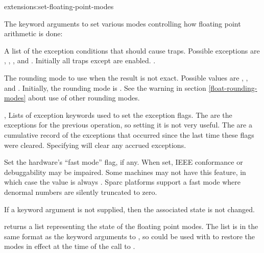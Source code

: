 \begin{defun}{extensions:}{set-floating-point-modes}{%
    }
  
  The keyword arguments to  set various
  modes controlling how floating point arithmetic is done:
  \begin{Lentry}
  
  \item[\kwd{traps}] A list of the exception conditions that should
    cause traps.  Possible exceptions are ,
    , ,  and
    .  Initially all traps except 
    are enabled.  .
    
  \item[\kwd{rounding-mode}] The rounding mode to use when the result
    is not exact. Possible values are ,
    ,  and .
    Initially, the rounding mode is . See the warning in
    section \ref{float-rounding-modes} about use of other rounding
    modes.
  
  \item[\kwd{current-exceptions}, \kwd{accrued-exceptions}] Lists of
    exception keywords used to set the exception flags.  The
     are the exceptions for the previous
    operation, so setting it is not very useful.  The
     are a cumulative record of the exceptions
    that occurred since the last time these flags were cleared.
    Specifying \code{()} will clear any accrued exceptions.
  
  \item[\kwd{fast-mode}] Set the hardware's ``fast mode'' flag, if
    any.  When set, IEEE conformance or debuggability may be impaired.
    Some machines may not have this feature, in which case the value
    is always \false.  Sparc platforms support a fast mode where
    denormal numbers are silently truncated to zero.
  \end{Lentry}
  If a keyword argument is not supplied, then the associated state is
  not changed.
  
   returns a list representing the
  state of the floating point modes.  The list is in the same format
  as the keyword arguments to , so
   could be used with  to
  restore the modes in effect at the time of the call to
  .
\end{defun}


